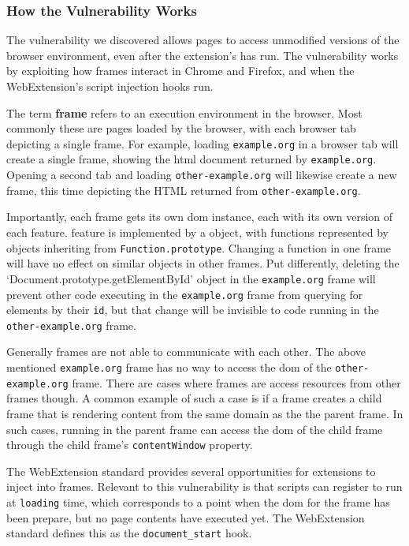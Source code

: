 \subsubsection{How the Vulnerability Works}
The vulnerability we discovered allows pages to access unmodified versions
of the browser environment, even after the extension's \JS has run.  The
vulnerability works by exploiting how frames interact in Chrome and Firefox,
and when the WebExtension's script injection hooks run.


The term \textbf{frame} refers to an execution environment in the browser.
Most commonly these are pages loaded by the browser, with each browser
tab depicting a single frame.  For example, loading \texttt{example.org} in
a browser tab will create a single frame, showing the \gls{html} document
returned by \texttt{example.org}.  Opening a second tab and loading
\texttt{other-example.org} will likewise create a new frame, this time
depicting the HTML returned from \texttt{other-example.org}.

Importantly, each frame gets its own \gls{dom} instance, each with its own
version of each \WAPI feature.  \WAPI feature is implemented by a \JS object,
with functions represented by objects inheriting from \texttt{Function.prototype}.
Changing a function in one frame will have no effect on similar objects
in other frames.  Put differently, deleting the `Document.prototype.getElementById'
object in the \texttt{example.org} frame will prevent other code executing in
the \texttt{example.org} frame from querying for elements by their \texttt{id},
but that change will be invisible to code running in the \texttt{other-example.org}
frame.

Generally frames are not able to communicate with each other.  The above
mentioned \texttt{example.org} frame has no way to access the \gls{dom} of the
\texttt{other-example.org} frame.  There are cases where frames are access
resources from other frames though.  A common example of such a case is if
a frame creates a child frame that is rendering content from the same domain
as the the parent frame.  In such cases, \JS running in the parent frame
can access the \gls{dom} of the child frame through the child frame's
\texttt{contentWindow} property.

% 


The WebExtension standard provides several opportunities for extensions to
inject \JS into frames.  Relevant to this vulnerability is that scripts can
register to run at \texttt{loading} time, which corresponds to a point when
the \gls{dom} for the frame has been prepare, but no page contents have
executed yet. The WebExtension standard defines this as the
\texttt{document\_start} hook.


